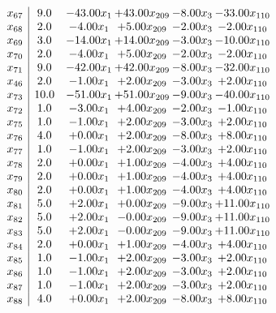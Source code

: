 \documentclass[8pt]{article}
\begin{document}
\[\begin{array}{c| c c@{\hskip 2pt} c@{\hskip 2pt} c@{\hskip 2pt} c@{\hskip 2pt} }
 x_{67}   &  9.0 & -43.00 x_{1} & + 43.00 x_{209} & -8.00 x_{3} & -33.00 x_{110}\\
 x_{68}   &  2.0 & -4.00 x_{1} & +  5.00 x_{209} & -2.00 x_{3} & -2.00 x_{110}\\
 x_{69}   &  3.0 & -14.00 x_{1} & + 14.00 x_{209} & -3.00 x_{3} & -10.00 x_{110}\\
 x_{70}   &  2.0 & -4.00 x_{1} & +  5.00 x_{209} & -2.00 x_{3} & -2.00 x_{110}\\
 x_{71}   &  9.0 & -42.00 x_{1} & + 42.00 x_{209} & -8.00 x_{3} & -32.00 x_{110}\\
 x_{46}   &  2.0 & -1.00 x_{1} & +  2.00 x_{209} & -3.00 x_{3} & +  2.00 x_{110}\\
 x_{73}   &  10.0 & -51.00 x_{1} & + 51.00 x_{209} & -9.00 x_{3} & -40.00 x_{110}\\
 x_{72}   &  1.0 & -3.00 x_{1} & +  4.00 x_{209} & -2.00 x_{3} & -1.00 x_{110}\\
 x_{75}   &  1.0 & -1.00 x_{1} & +  2.00 x_{209} & -3.00 x_{3} & +  2.00 x_{110}\\
 x_{76}   &  4.0 & +  0.00 x_{1} & +  2.00 x_{209} & -8.00 x_{3} & +  8.00 x_{110}\\
 x_{77}   &  1.0 & -1.00 x_{1} & +  2.00 x_{209} & -3.00 x_{3} & +  2.00 x_{110}\\
 x_{78}   &  2.0 & +  0.00 x_{1} & +  1.00 x_{209} & -4.00 x_{3} & +  4.00 x_{110}\\
 x_{79}   &  2.0 & +  0.00 x_{1} & +  1.00 x_{209} & -4.00 x_{3} & +  4.00 x_{110}\\
 x_{80}   &  2.0 & +  0.00 x_{1} & +  1.00 x_{209} & -4.00 x_{3} & +  4.00 x_{110}\\
 x_{81}   &  5.0 & +  2.00 x_{1} & +  0.00 x_{209} & -9.00 x_{3} & + 11.00 x_{110}\\
 x_{82}   &  5.0 & +  2.00 x_{1} & -0.00 x_{209} & -9.00 x_{3} & + 11.00 x_{110}\\
 x_{83}   &  5.0 & +  2.00 x_{1} & -0.00 x_{209} & -9.00 x_{3} & + 11.00 x_{110}\\
 x_{84}   &  2.0 & +  0.00 x_{1} & +  1.00 x_{209} & -4.00 x_{3} & +  4.00 x_{110}\\
 x_{85}   &  1.0 & -1.00 x_{1} & +  2.00 x_{209} & -3.00 x_{3} & +  2.00 x_{110}\\
 x_{86}   &  1.0 & -1.00 x_{1} & +  2.00 x_{209} & -3.00 x_{3} & +  2.00 x_{110}\\
 x_{87}   &  1.0 & -1.00 x_{1} & +  2.00 x_{209} & -3.00 x_{3} & +  2.00 x_{110}\\
 x_{88}   &  4.0 & +  0.00 x_{1} & +  2.00 x_{209} & -8.00 x_{3} & +  8.00 x_{110}\\

\end{array}\]
\end{document}
